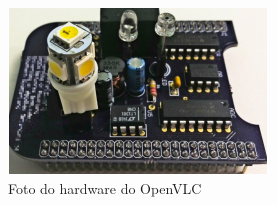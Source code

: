 \begin{figure}[!htbp]
    \caption{Foto do hardware do OpenVLC} \label{fig_minipage_imagem1}
    \includegraphics[scale=0.9]{images/Cape.png}
\end{figure}

